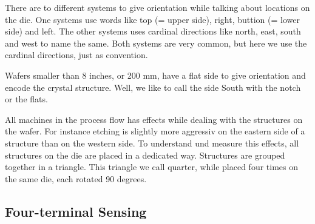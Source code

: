 There are to different systems to give orientation while talking about locations on the die. One systems use words like top (= upper side), right, buttion (= lower side) and left. The other systems uses cardinal directions like north, east, south and west to name the same. Both systems are very common, but here we use the cardinal directions, just as convention.

Wafers smaller than 8 inches, or 200 mm, have a flat side to give orientation and encode the crystal structure. Well, we like to call the side South with the notch or the flats.

All machines in the process flow has effects while dealing with the structures on the wafer. For instance etching is slightly more aggressiv on the eastern side of a structure than on the western side. To understand und measure this effects, all structures on the die are placed in a dedicated way. Structures are grouped together in a triangle. This triangle we call quarter, while placed four times on the same die, each rotated 90 degrees.



\subsection{Four-terminal Sensing}



\clearpage
